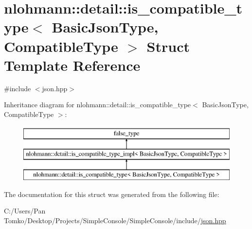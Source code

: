 \hypertarget{structnlohmann_1_1detail_1_1is__compatible__type}{}\section{nlohmann\+::detail\+::is\+\_\+compatible\+\_\+type$<$ Basic\+Json\+Type, Compatible\+Type $>$ Struct Template Reference}
\label{structnlohmann_1_1detail_1_1is__compatible__type}


{\ttfamily \#include $<$json.\+hpp$>$}

Inheritance diagram for nlohmann\+::detail\+::is\+\_\+compatible\+\_\+type$<$ Basic\+Json\+Type, Compatible\+Type $>$\+:\begin{figure}[H]
\begin{center}
\leavevmode
\includegraphics[height=3.000000cm]{d3/d71/structnlohmann_1_1detail_1_1is__compatible__type}
\end{center}
\end{figure}


The documentation for this struct was generated from the following file\+:\begin{DoxyCompactItemize}
\item 
C\+:/\+Users/\+Pan Tomko/\+Desktop/\+Projects/\+Simple\+Console/\+Simple\+Console/include/\mbox{\hyperlink{json_8hpp}{json.\+hpp}}\end{DoxyCompactItemize}
